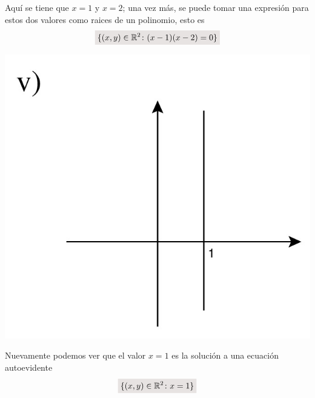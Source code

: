 \documentclass[a4paper,10pt]{article}
\newcommand{\real}{\mathbb{R}}
\newcommand{\resalta}[1]{\colorbox{g}{$\displaystyle #1$}}
\begin{document}
\begin{enumerate}
\begin{enumerate}[label = \roman*)]
\begin{minipage}[c]{0.3\linewidth}
            \end{minipage}
            \begin{minipage}[c]{0.7\linewidth}
                Aqu\'i se tiene que $x=1$ y $x=2$; una vez m\'as, se puede tomar una expresi\'on para estos dos valores como raices de un polinomio, esto es
                \begin{equation}
                    \notag \resalta{\{(x,y)\in \real^{2} \colon (x-1)(x-2)=0\}}
                \end{equation}
            \end{minipage}
            \begin{minipage}[c]{0.3\linewidth}
                \centering
                    \includegraphics[scale=0.15]{4ii-5}
            \end{minipage}
            \begin{minipage}[c]{0.7\linewidth}
                Nuevamente podemos ver que el valor $x=1$ es la soluci\'on a una ecuaci\'on autoevidente
                \begin{equation}
                    \notag \resalta{\{(x,y)\in \real^{2} \colon x=1\}}
                \end{equation}
            \end{minipage}
            \begin{minipage}[c]{0.3\linewidth}
                \centering

\end{minipage}
\end{enumerate}
\end{enumerate}
\end{document}
